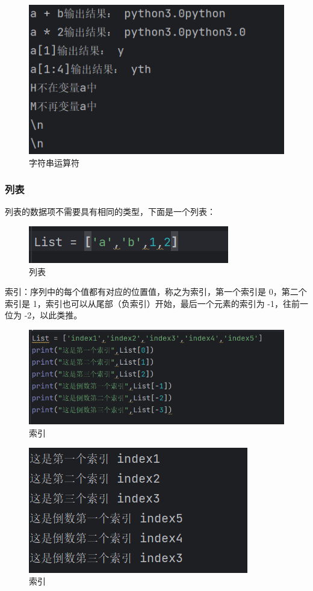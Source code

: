 \documentclass{ctexart}
\begin{document}
	\begin{figure}[H]
		\centering
		\includegraphics[scale=0.5]{3.24}
		\caption{字符串运算符}
	\end{figure}
	
	\subsubsection{列表}
	列表的数据项不需要具有相同的类型，下面是一个列表：
	
	\begin{figure}[H]
		\centering
		\includegraphics{3.25}
		\caption{列表}
	\end{figure}
	
	索引：序列中的每个值都有对应的位置值，称之为索引，第一个索引是 0，第二个索引是 1，索引也可以从尾部（负索引）开始，最后一个元素的索引为 -1，往前一位为 -2，以此类推。
	
	\begin{figure}[H]
		\centering
		\includegraphics[scale=0.5]{3.26}
		\caption{索引}
	\end{figure}
	
	\begin{figure}[H]
		\centering
		\includegraphics[scale=0.5]{3.27}
		\caption{索引}
	\end{figure}
	
\end{document}

